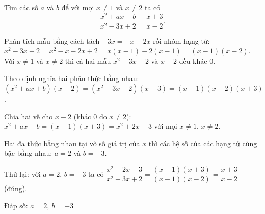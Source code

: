 \begin{problem}[8DS-PS-048]
Tìm các số $a$ và $b$ để với mọi $x \neq 1$ và $x \neq 2$ ta có
\[ \dfrac{x^2 + ax + b}{x^2 - 3x + 2} = \dfrac{x + 3}{x - 2}. \]

\begin{solution}
Phân tích mẫu bằng cách tách $-3x = -x - 2x$ rồi nhóm hạng tử: $x^2 - 3x + 2 = x^2 - x - 2x + 2 = x(x - 1) - 2(x - 1) = (x - 1)(x - 2)$. Với $x \neq 1$ và $x \neq 2$ thì cả hai mẫu $x^2 - 3x + 2$ và $x - 2$ đều khác $0$.

Theo định nghĩa hai phân thức bằng nhau: $(x^2 + ax + b)(x - 2) = (x^2 - 3x + 2)(x + 3) = (x - 1)(x - 2)(x + 3)$.

Chia hai vế cho $x - 2$ (khác $0$ do $x \neq 2$): $x^2 + ax + b = (x - 1)(x + 3) = x^2 + 2x - 3$ với mọi $x \neq 1$, $x \neq 2$.

Hai đa thức bằng nhau tại vô số giá trị của $x$ thì các hệ số của các hạng tử cùng bậc bằng nhau: $a = 2$ và $b = -3$.

Thử lại: với $a = 2$, $b = -3$ ta có $\dfrac{x^2 + 2x - 3}{x^2 - 3x + 2} = \dfrac{(x - 1)(x + 3)}{(x - 1)(x - 2)} = \dfrac{x + 3}{x - 2}$ (đúng).

Đáp số: $\boxed{a = 2,\ b = -3}$
\end{solution}
\end{problem}

